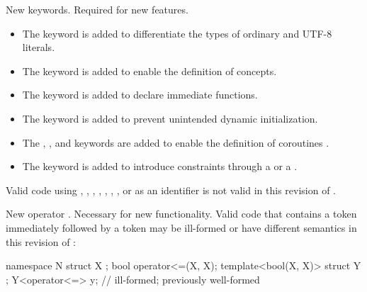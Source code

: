 \change
New keywords.
\rationale
Required for new features.
\begin{itemize}
\item
The  keyword is added to differentiate
the types of ordinary and UTF-8 literals.
\item
The  keyword is
added to enable the definition of concepts.
\item
The  keyword is added to
declare immediate functions.
\item
The  keyword is added to
prevent unintended dynamic initialization.
\item
The , , and  keywords are added
to enable the definition of coroutines .
\item
The  keyword is added
to introduce constraints through a 
or a .
\end{itemize}
\effectafteritemize
Valid \CppXVII{} code using
,
,
,
,
, , ,
or 
as an identifier is not valid in this revision of \Cpp{}.

\change
New operator \tcode{<=>}.
\rationale
Necessary for new functionality.
\effect
Valid \CppXVII{} code that contains a \tcode{<=} token
immediately followed by a \tcode{>} token
may be ill-formed or have different semantics in this revision of \Cpp{}:
\begin{codeblock}
namespace N {
  struct X {};
  bool operator<=(X, X);
  template<bool(X, X)> struct Y {};
  Y<operator<=> y;              // ill-formed; previously well-formed
}
\end{codeblock}

